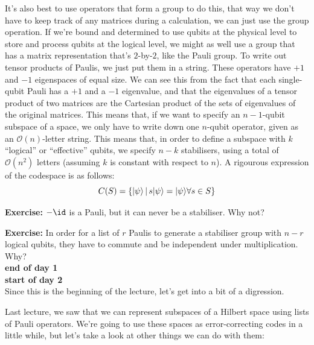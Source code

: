 \documentclass[10pt,a4paper, english]{scrartcl}
\begin{document}
It's also best to use operators that form a group to do this, that way we don't have to keep track of any matrices during a calculation, we can just use the group operation. 
If we're bound and determined to use qubits at the physical level to store and process qubits at the logical level, we might as well use a group that has a matrix representation that's $2$-by-$2$, like the Pauli group. 
To write out tensor products of Paulis, we just put them in a string. 
These operators have $+1$ and $-1$ eigenspaces of equal size.
We can see this from the fact that each single-qubit Pauli has a $+1$ and a $-1$ eigenvalue, and that the eigenvalues of a tensor product of two matrices are the Cartesian product of the sets of eigenvalues of the original matrices.  
This means that, if we want to specify an $n-1$-qubit subspace of a space, we only have to write down one $n$-qubit operator, given as an $\mathcal{O}(n)$-letter string. 
This means that, in order to define a subspace with $k$ ``logical'' or ``effective'' qubits, 
we specify $n-k$ stabilisers, using a total of $\mathcal{O}(n^2)$ letters (assuming $k$ is constant with respect to $n$).
A rigourous expression of the codespace is as follows:
\begin{equation}
C(S) = \left \lbrace {\left\vert{\psi}\right\rangle} \, \middle \vert \, s{\left\vert{\psi}\right\rangle}={\left\vert{\psi}\right\rangle} \forall s \in S \right \rbrace
\end{equation}

\textbf{Exercise: }$-\id$ is a Pauli, but it can never be a stabiliser. Why not?

\textbf{Exercise: }In order for a list of $r$ Paulis to generate a stabiliser group with $n-r$ logical qubits, they have to commute and be independent under multiplication. Why?\\
{\LARGE \textbf{end of day 1}}\\
{\LARGE \textbf{start of day 2}}\\
Since this is the beginning of the lecture, let's get into a bit of a digression. 

Last lecture, we saw that we can represent subspaces of a Hilbert space using lists of Pauli operators. 
We're going to use these spaces as error-correcting codes in a little while, but let's take a look at other things we can do with them:
\end{document}
